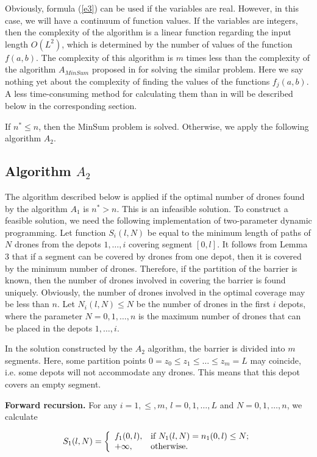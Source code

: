 \documentclass[runningheads]{llncs}
\begin{document}
Obviously, formula (\ref{e3}) can be used if the variables are real. However, in this case, we will have a continuum of function values. If the variables are integers, then the complexity of the algorithm is a linear function regarding the input length $O(L^2)$, which is determined by the number of values of the function $f(a,b)$. The complexity of this algorithm is $m$ times less than the complexity of the algorithm $A_{MinSum}$ proposed in \cite{ErShad24} for solving the similar problem. Here we say nothing yet about the complexity of finding the values of the functions $f_j(a,b)$. A less time-consuming method for calculating them than in \cite{ErShad24} will be described below in the corresponding section.

If $n^*\leq n$, then the MinSum problem is solved. Otherwise, we apply the following algorithm $A_2$.

\subsection{Algorithm $A_2$}
The algorithm described below is applied if the optimal number of drones found by the algorithm $A_1$ is $n^*>n$. This is an infeasible solution. To construct a feasible solution, we need the following implementation of two-parameter dynamic programming. Let function $S_i(l,N)$ be equal to the minimum length of paths of $N$ drones from the depots $1,\ldots,i$ covering segment $[0,l]$. It follows from Lemma 3 that if a segment can be covered by drones from one depot, then it is covered by the minimum number of drones. Therefore, if the partition of the barrier is known, then the number of drones involved in covering the barrier is found uniquely. Obviously, the number of drones involved in the optimal coverage may be less than $n$. Let $N_i(l,N)\leq N$ be the number of drones in the first $i$ depots, where the parameter $N=0,1,\ldots,n$ is the maximum number of drones that can be placed in the depots $1,\ldots,i$.

In the solution constructed by the $A_2$ algorithm, the barrier is divided into $m$ segments. Here, some partition points $0=z_0\leq z_1\leq\ldots\leq z_m=L$ may coincide, i.e. some depots will not accommodate any drones. This means that this depot covers an empty segment.

\textbf{Forward recursion.}
For any $i=1,\leq,m$, $l=0,1,\ldots,L$ and $N=0,1,\ldots,n$, we calculate

\begin{equation}\label{e4}
 S_1(l,N)=
 \left\{
  \begin{array}{ll}
    f_1(0,l), & \hbox{if $N_1(l,N)=n_1(0,l)\leq N$;} \\
    +\infty, & \hbox{otherwise.}
  \end{array}
 \right.
\end{equation}
\end{document}
